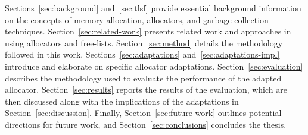 
Sections~\ref{sec:background} and~\ref{sec:tlsf} provide essential background information on the concepts of memory allocation, allocators, and garbage collection techniques. Section~\ref{sec:related-work} presents related work and approaches in using allocators and free-lists. Section~\ref{sec:method} details the methodology followed in this work. Sections~\ref{sec:adaptations} and~\ref{sec:adaptations-impl} introduce and elaborate on specific allocator adaptations. Section~\ref{sec:evaluation} describes the methodology used to evaluate the performance of the adapted allocator. Section~\ref{sec:results} reports the results of the evaluation, which are then discussed along with the implications of the adaptations in Section~\ref{sec:discussion}. Finally, Section~\ref{sec:future-work} outlines potential directions for future work, and Section~\ref{sec:conclusions} concludes the thesis.

